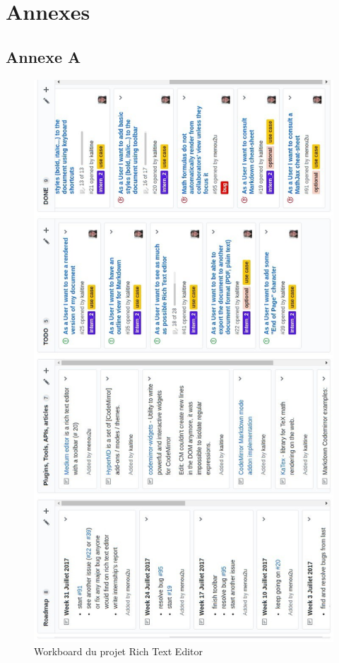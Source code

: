 \documentclass[12pt]{article}
\begin{document}
\clearpage

\newpage
{}
\section*{Annexes}
\subsection*{Annexe A}
\begin{figure}[H]
\centering
\includegraphics[scale=0.52]{gallery/workboard.jpg}
\caption[nom dans le sommaire]{Workboard du projet Rich Text Editor}
\label{fig:gallery1}
\end{figure}
\end{document}
